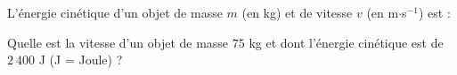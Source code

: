 \begin{exo}{}
	L'énergie cinétique d'un objet de masse $m$ (en kg) et de vitesse $v$ (en m$\cdot$s$^{-1}$) est : 

	Quelle est la vitesse d'un objet de masse $75$ kg et dont l'énergie cinétique est de $2\ 400$ J (J = Joule) ?
\end{exo}
